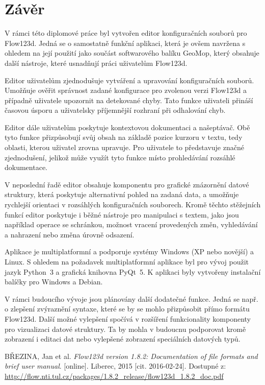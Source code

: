 \documentclass[FM,bw,DP]{tulthesis}
\begin{document}
\chapter*{Závěr}
V rámci této diplomové práce byl vytvořen editor konfiguračních souborů pro Flow123d. Jedná se o samostatně funkční aplikaci, která je ovšem navržena s ohledem na její použití jako součást softwarového balíku GeoMop, který obsahuje další nástroje, které usnadňují práci uživatelům Flow123d.

Editor uživatelům zjednodušuje vytváření a upravování konfiguračních souborů. Umožňuje ověřit správnost zadané konfigurace pro zvolenou verzi Flow123d a případně uživatele upozornit na detekované chyby. Tato funkce uživateli přináší časovou úsporu a uživatelsky příjemnější rozhraní při odhalování chyb.

Editor dále uživatelům poskytuje kontextovou dokumentaci a našeptávač. Obě tyto funkce přizpůsobují svůj obsah na základě pozice kurzoru v textu, tedy oblasti, kterou uživatel zrovna upravuje. Pro uživatele to představuje značné zjednodušení, jelikož může využít tyto funkce místo prohledávání rozsáhlé dokumentace.

V neposlední řadě editor obsahuje komponentu pro grafické znázornění datové struktury, která poskytuje alternativní pohled na zadaná data, a umožňuje rychlejší orientaci v rozsáhlých konfiguračních souborech. Kromě těchto stěžejních funkcí editor poskytuje i běžné nástroje pro manipulaci s textem, jako jsou například operace se schránkou, možnost vracení provedených změn, vyhledávání a nahrazení nebo změna úrovně odsazení.

Aplikace je multiplatformní a podporuje systémy Windows (XP nebo novější) a Linux. S ohledem na požadavek multiplatformní aplikace byl pro vývoj použit jazyk Python~3 a grafická knihovna PyQt~5. K aplikaci byly vytvořeny instalační balíčky pro Windows a Debian.

V rámci budoucího vývoje jsou plánovány další dodatečné funkce. Jedná se např. o zlepšení zvýraznění syntaxe, které se by se mohlo přizpůsobit přímo formátu Flow123d. Další možné vylepšení spočívá v rozšíření funkcionality komponenty pro vizualizaci datové struktury. Ta by mohla v budoucnu podporovat kromě zobrazení i editaci dat nebo vylepšené zobrazení speciálních datových typů.

\begin{thebibliography}{9}


BŘEZINA, Jan et al. \textit{Flow123d version 1.8.2: Documentation of file formats and brief user manual}. [online]. Liberec, 2015 [cit. 2016-02-24]. Dostupné z: \url{http://flow.nti.tul.cz/packages/1.8.2_release/flow123d_1.8.2_doc.pdf}
	
\end{thebibliography}
\end{document}
